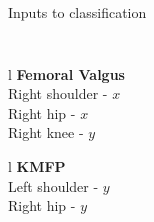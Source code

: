 \begin{frame}[fragile]{Inputs to classification}
\begin{columns}
\begin{table}
\begin{center}
\begin{minipage}[t]{0.25\textwidth}
\begin{tabu}[t]{l}
            \end{tabu}
          \end{minipage}%
          \begin{minipage}[t]{0.24\textwidth}
            \begin{tabu}[t]{l}
              \small
              \textbf{Femoral Valgus} \\ \hline \hline
              Right shoulder - $x$\\
              Right hip - $x$\\
              Right knee - $y$\\
            \end{tabu}
          \end{minipage}%
          \begin{minipage}[t]{0.25\textwidth}
            \begin{tabu}[t]{l}
              \small
              \textbf{KMFP} \\ \hline \hline
              Left shoulder - $y$\\
              Right hip - $y$\\
              \\
               \\
            \end{tabu}
          \end{minipage}%
      \end{center}
  \end{table}
  \end{columns}
\end{frame}

